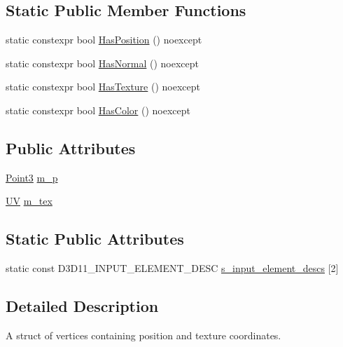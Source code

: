 \subsection*{Static Public Member Functions}
\begin{DoxyCompactItemize}
\item 
static constexpr bool \hyperlink{structmage_1_1rendering_1_1_vertex_position_texture_a251093bc0caad749852ab5138f306909}{Has\+Position} () noexcept
\item 
static constexpr bool \hyperlink{structmage_1_1rendering_1_1_vertex_position_texture_abd20ebeb7462cc449cd4a41cf4d6c2c9}{Has\+Normal} () noexcept
\item 
static constexpr bool \hyperlink{structmage_1_1rendering_1_1_vertex_position_texture_aee946b0a6ec454ed0e6d0614965fb2ad}{Has\+Texture} () noexcept
\item 
static constexpr bool \hyperlink{structmage_1_1rendering_1_1_vertex_position_texture_a66d7754ec7a271ec3af1883774876646}{Has\+Color} () noexcept
\end{DoxyCompactItemize}
\subsection*{Public Attributes}
\begin{DoxyCompactItemize}
\item 
\hyperlink{structmage_1_1_point3}{Point3} \hyperlink{structmage_1_1rendering_1_1_vertex_position_texture_ae296d14afcc5b58ee99a1575d87f1e0f}{m\+\_\+p}
\item 
\hyperlink{structmage_1_1_u_v}{UV} \hyperlink{structmage_1_1rendering_1_1_vertex_position_texture_a958b1fdb6353ebc269606b9fcd8ab3d3}{m\+\_\+tex}
\end{DoxyCompactItemize}
\subsection*{Static Public Attributes}
\begin{DoxyCompactItemize}
\item 
static const D3\+D11\+\_\+\+I\+N\+P\+U\+T\+\_\+\+E\+L\+E\+M\+E\+N\+T\+\_\+\+D\+E\+SC \hyperlink{structmage_1_1rendering_1_1_vertex_position_texture_ade58ac70fb8177765cb73ba463acdd75}{s\+\_\+input\+\_\+element\+\_\+descs} \mbox{[}2\mbox{]}
\end{DoxyCompactItemize}


\subsection{Detailed Description}
A struct of vertices containing position and texture coordinates. 

